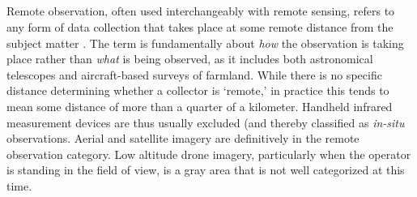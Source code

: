 %
%
%
%


\subsection{} \label{sec:remote}

Remote observation, often used interchangeably with remote sensing, refers to any form of data collection that takes place at some remote distance from the subject matter \cite{jensenRemoteSensingEnvironment2006}. The term is fundamentally about \textit{how} the observation is taking place rather than \textit{what} is being observed, as it includes both astronomical telescopes and aircraft-based surveys of farmland. While there is no specific distance determining whether a collector is `remote,' in practice this tends to mean some distance of more than a quarter of a kilometer. Handheld infrared measurement devices are thus usually excluded (and thereby classified as \textit{in-situ} observations. Aerial and satellite imagery are definitively in the remote observation category. Low altitude drone imagery, particularly when the operator is standing in the field of view, is a gray area that is not well categorized at this time.

